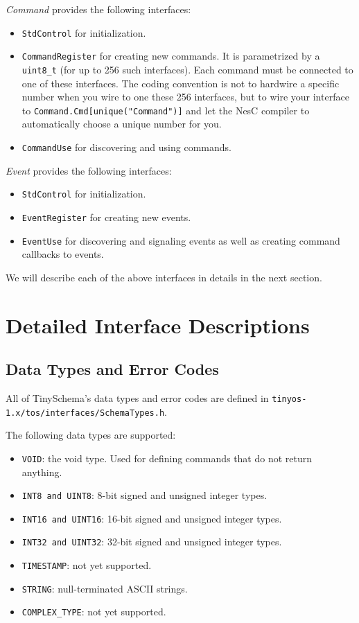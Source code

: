 \documentclass[11pt]{article}
\newcommand{\docroot}{tinyos-1.x}
\begin{document}
{\em Command} provides the following interfaces:
\begin{itemize}
\item {\tt StdControl} for initialization.
\item {\tt CommandRegister} for creating new commands.  It is parametrized
by a {\tt uint8\_t} (for up to 256 such interfaces).  Each command must be connected to
one of these interfaces.  The coding convention is not
to hardwire a specific number when you wire to one these 256 interfaces, but
to wire your interface to {\tt Command.Cmd[unique("Command")]} and let
the NesC compiler to automatically choose a unique number for you.
\item {\tt CommandUse} for discovering and using commands.
\end{itemize}

{\em Event} provides the following interfaces:
\begin{itemize}
\item {\tt StdControl} for initialization.
\item {\tt EventRegister} for creating new events.
\item {\tt EventUse} for discovering and signaling events as well as
creating command callbacks to events.
\end{itemize}

We will describe each of the above interfaces in details in the next
section.

\section{Detailed Interface Descriptions}

\subsection{Data Types and Error Codes}
All of TinySchema's data types and error codes are defined in 
{\tt \docroot/tos/interfaces/SchemaTypes.h}.

The following data types are supported:
\begin{itemize}
\item {\tt VOID}: the void type.  Used for defining commands that do not
return anything.
\item {\tt INT8 and UINT8}: 8-bit signed and unsigned integer types.
\item {\tt INT16 and UINT16}: 16-bit signed and unsigned integer types.
\item {\tt INT32 and UINT32}: 32-bit signed and unsigned integer types.
\item {\tt TIMESTAMP}: not yet supported.
\item {\tt STRING}: null-terminated ASCII strings.
\item {\tt COMPLEX\_TYPE}: not yet supported.
\end{itemize}
\end{document}
